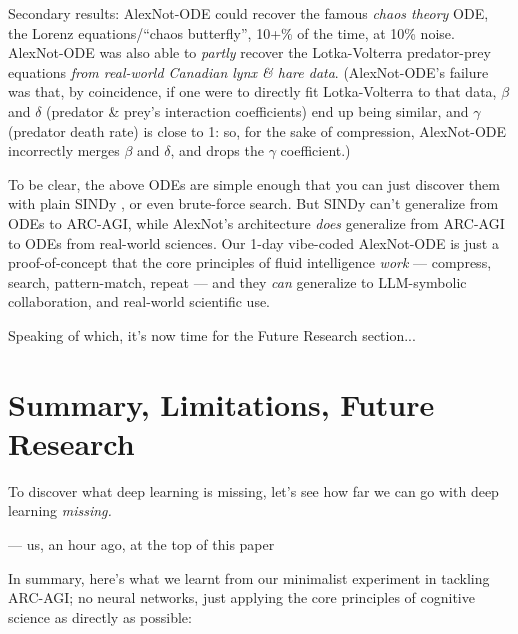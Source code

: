 \documentclass[11pt]{article}
\renewenvironment{quote}
  {\begin{tcolorbox}[enhanced, breakable, sharp corners, frame hidden,
     colback=quotebg, borderline west={3pt}{0pt}{quotebar},
     left=8pt, right=8pt, top=5pt, bottom=5pt,
     before upper={\setlength{\parskip}{0.6em}}]}
  {\end{tcolorbox}}
\begin{document}
Secondary results: AlexNot-ODE could recover the famous \textit{chaos theory} ODE, the Lorenz equations/``chaos butterfly'', 10+\% of the time, at 10\% noise. AlexNot-ODE was also able to \textit{partly} recover the Lotka-Volterra predator-prey equations \textit{from real-world Canadian lynx \& hare data}. \citep{lynx_hare_stan} (AlexNot-ODE's failure was that, by coincidence, if one were to directly fit Lotka-Volterra to that data, $\beta$ and $\delta$ (predator \& prey's interaction coefficients) end up being similar, and $\gamma$ (predator death rate) is close to 1: so, for the sake of compression, AlexNot-ODE incorrectly merges $\beta$ and $\delta$, and drops the $\gamma$ coefficient.)

To be clear, the above ODEs are simple enough that you can just discover them with plain SINDy \citep{sindy}, or even brute-force search. But SINDy can't generalize from ODEs to ARC-AGI, while AlexNot's architecture \textit{does} generalize from ARC-AGI to ODEs from real-world sciences. Our 1-day vibe-coded AlexNot-ODE is just a proof-of-concept that the core principles of fluid intelligence \textit{work} — compress, search, pattern-match, repeat — and they \textit{can} generalize to LLM-symbolic collaboration, and real-world scientific use.

Speaking of which, it's now time for the Future Research section...





\section{Summary, Limitations, Future Research}\label{sec:limitations}
\begin{quote}
To discover what deep learning is missing, let's see how far we can go with deep learning \textit{missing.}

— us, an hour ago, at the top of this paper
\end{quote}
In summary, here's what we learnt from our minimalist experiment in tackling ARC-AGI; no neural networks, just applying the core principles of cognitive science as directly as possible:
\end{document}
